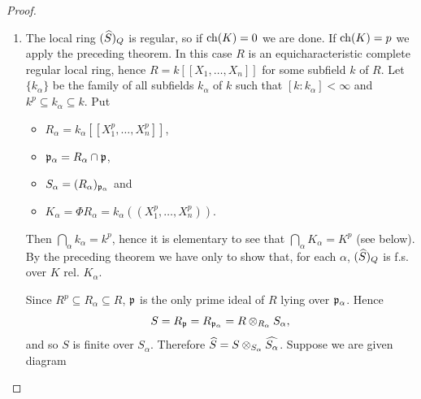 \documentclass[../main]{subfiles}
\begin{document}
\begin{proof}
\begin{enumerate}[label = Step \Roman*.]
    We are given $Q \in \Spec(\completion B)$ such that $Q \cap B = (0)$. Then $(\completion B)_Q$ is a localization of \[L \otimes_{B'} \completion {B'} = L \otimes_S {\completion S} = L \otimes_K (K \otimes_S {\completion S}),\] and $L$ is a finite extension of the field $K$. In general if $T$ is a $K$-algebra, if $M \in \Spec(L \otimes_K T)$ and $m = M \cap T$, and if $T_m$ is f.s. over $K$, then $(L \otimes T)_M$ is a localization of $L \otimes_K T_m$ and hence is f.s. over $L$. Thus it suffices to show that ${\completion S}_{Q \cap {\completion S}}$ is f.s. over $K$. Thus the problem is reduced to proving that, if $R$ is a complete regular local ring with quotient field $K$, if $\ideal p \in \Spec(R)$ and $S = R_{\ideal p}$, and if $Q$ is a prime ideal of $\completion S$ such that $Q \cap S = (0)$, then $(\completion S)_Q$ is f.s. over $K$.
    \item The local ring $(\completion S)_Q$ is regular, so if $\operatorname{ch}(K) = 0$ we are done. If $\operatorname{ch}(K) = p$ we apply the preceding theorem. In this case $R$ is an equicharacteristic complete regular local ring, hence $R = k[[X_1, \ldots, X_n]]$ for some subfield $k$ of $R$. Let $\{k_\alpha\}$ be the family of all subfields $k_\alpha$ of $k$ such that $[k : k_\alpha] < \infty$ and $k^p \subseteq k_\alpha \subseteq k$. Put
    \begin{itemize}
        \item $R_\alpha = k_\alpha[[X_1^p, \ldots, X_n^p]]$,
        \item  ${\mathfrak{p}}_\alpha = R_\alpha \cap \mathfrak{p}$,
        \item $S_\alpha = (R_\alpha)_{\mathfrak{p}_\alpha}$ and
        \item $K_\alpha = \Phi R_\alpha = k_\alpha((X_1^p, \ldots, X_n^p)).$
    \end{itemize}
    Then $\bigcap_\alpha k_\alpha = k^p$, hence it is elementary to see that $\bigcap_\alpha K_\alpha = K^p$ (see below). By the preceding theorem we have only to show that, for each $\alpha$, $(\completion S)_Q$ is f.s. over $K$ rel. $K_\alpha$.

    Since $R^p \subseteq R_\alpha \subseteq R$, $\mathfrak{p}$ is the only prime ideal of $R$ lying over ${\mathfrak{p}}_\alpha$. Hence \[S = R_{\mathfrak{p}} = R_{{\mathfrak{p}}_\alpha} = R \otimes_{R_\alpha} S_\alpha,\] and so $S$ is finite over $S_\alpha$. Therefore $\widehat{S} = S \otimes_{S_\alpha} \widehat{S_\alpha}$. Suppose we are given diagram 

\begin{center}
\end{center}


\end{enumerate}
\end{proof}
\end{document}
